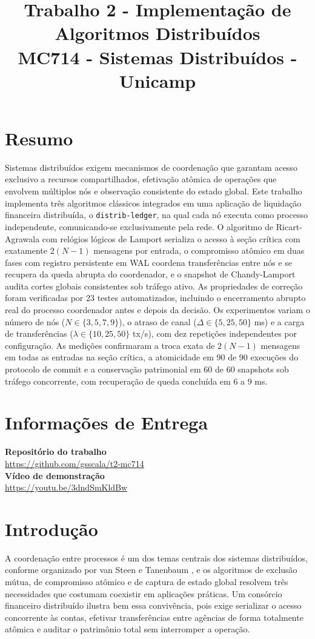 \documentclass[conference]{IEEEtran}
\title{
    {\huge Trabalho 2 - Implementação de Algoritmos Distribuídos} \\[0.2cm]
    {\small MC714 - Sistemas Distribuídos - Unicamp}
}
\author{\IEEEauthorblockN{Celso Gabriel Ferreira Marçal Prado (RA: 235393)}
\IEEEauthorblockA{\texttt{c235393@dac.unicamp.br}}
\and
\IEEEauthorblockN{Giovanni Santos Scalabrin (RA: 281210)}
\IEEEauthorblockA{\texttt{g281210@dac.unicamp.br}}}
\begin{document}
\maketitle

\section*{Resumo}
Sistemas distribuídos exigem mecanismos de coordenação que garantam acesso
exclusivo a recursos compartilhados, efetivação atômica de operações que
envolvem múltiplos nós e observação consistente do estado global. Este
trabalho implementa três algoritmos clássicos integrados em uma aplicação de
liquidação financeira distribuída, o \texttt{distrib-ledger}, na qual cada nó
executa como processo independente, comunicando-se exclusivamente pela rede.
O algoritmo de Ricart-Agrawala com relógios lógicos de Lamport serializa o
acesso à seção crítica com exatamente $2(N-1)$ mensagens por entrada, o
compromisso atômico em duas fases com registro persistente em WAL coordena
transferências entre nós e se recupera da queda abrupta do coordenador, e o
snapshot de Chandy-Lamport audita cortes globais consistentes sob tráfego
ativo. As propriedades de correção foram verificadas por 23 testes
automatizados, incluindo o encerramento abrupto real do processo coordenador
antes e depois da decisão. Os experimentos variam o número de nós
($N \in \{3, 5, 7, 9\}$), o atraso de canal ($\Delta \in \{5, 25, 50\}$ ms) e
a carga de transferências ($\lambda \in \{10, 25, 50\}$ tx/s), com dez
repetições independentes por configuração. As medições confirmaram a troca
exata de $2(N-1)$ mensagens em todas as entradas na seção crítica, a
atomicidade em 90 de 90 execuções do protocolo de commit e a conservação
patrimonial em 60 de 60 snapshots sob tráfego concorrente, com recuperação de
queda concluída em 6 a 9 ms.

\section*{Informações de Entrega}
\textbf{Repositório do trabalho}\\
\url{https://github.com/gsscala/t2-mc714}\\
\textbf{Vídeo de demonstração}\\
\url{https://youtu.be/3dndSmKldBw}


\section{Introdução}
A coordenação entre processos é um dos temas centrais dos sistemas
distribuídos, conforme organizado por van Steen e Tanenbaum \cite{vansteen2023},
e os algoritmos de exclusão mútua, de compromisso atômico e de captura de estado
global resolvem três necessidades que costumam coexistir em aplicações
práticas. Um consórcio financeiro distribuído ilustra bem essa convivência, pois
exige serializar o acesso concorrente às contas, efetivar transferências entre
agências de forma totalmente atômica e auditar o patrimônio total sem
interromper a operação.
\end{document}
